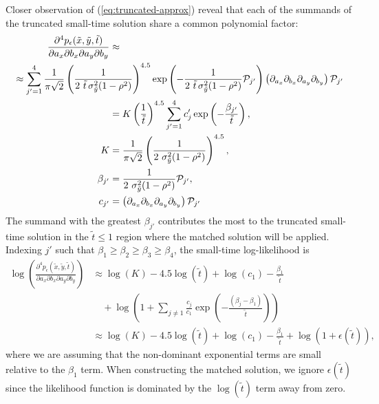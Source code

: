 Closer observation of (\ref{eq:truncated-approx}) reveal that each of
the summands of the truncated small-time solution share a common
polynomial factor:
\begin{align*}
  \frac{\partial^4 p_\epsilon(\tilde{x}, \tilde{y}, \tilde{t})}{\partial a_x
  \partial b_x \partial a_y \partial b_y} &\approx \\
  \MoveEqLeft[10] \approx \sum_{j' = 1}^{4} \frac{1}{\pi\sqrt{2}} \left(\frac{1}{2\,\,\tilde{t}\, \sigma_{\tilde{y}}^2 (1-\rho^2)} \right)^{4.5}
  \exp\left( -\frac{1}{2\,\,\tilde{t}\, \sigma_{\tilde{y}}^2 (1-\rho^2)} \mathcal{P}_{j'}\right)
  \left(\partial_{a_x}\partial_{b_x} \partial_{a_y}\partial_{b_y} \right)\mathcal{P}_{j'} \\
                                          &= K \left(\frac{1}{\tilde{t}} \right)^{4.5} \sum_{j'=1}^4 c_j' \exp\left( -\frac{\beta_{j'}}{\tilde{t}} \right), \\
  K &= \frac{1}{\pi\sqrt{2}} \left(\frac{1}{2\,\, \sigma_{\tilde{y}}^2 (1-\rho^2)} \right)^{4.5}, \\
  \beta_{j'} &= \frac{1}{2\,\, \sigma_{\tilde{y}}^2 (1-\rho^2)} \mathcal{P}_{j'}, \\
  c_{j'} &= \left(\partial_{a_x}\partial_{b_x} \partial_{a_y}\partial_{b_y} \right)\mathcal{P}_{j'}
\end{align*}
The summand with the greatest $\beta_{j'}$ contributes the most to the
truncated small-time solution in the $\tilde{t} \leq 1$ region where
the matched solution will be applied. Indexing $j'$ such that
$\beta_1 \geq \beta_2 \geq \beta_3 \geq \beta_4$, the small-time
log-likelihood is
\begin{align}
  \log\left( \frac{\partial^4 p_\epsilon(\tilde{x}, \tilde{y}, \tilde{t})}{\partial a_x
  \partial b_x \partial a_y \partial b_y} \right) &\approx \log(K) - 4.5\log(\tilde{t}) + \log(c_1) - \frac{\beta_1}{\tilde{t}} \nonumber \\
  &\quad + \log\left(1 + \sum_{j \neq 1} \frac{c_j}{c_1}\exp\left( -\frac{(\beta_j-\beta_1)}{\tilde{t}} \right) \right) \nonumber \\
  &\approx \log(K) - 4.5\log(\tilde{t}) + \log(c_1) - \frac{\beta_1}{\tilde{t}} + \log\left(1 + \epsilon(\tilde{t}) \right), \label{eq:small-time-log-like}
\end{align}
where we are assuming that the non-dominant exponential terms are
small relative to the $\beta_1$ term. When
constructing the matched solution, we ignore $\epsilon(\tilde{t})$
since the likelihood function is dominated by the $\log(\tilde{t})$
term away from zero.

